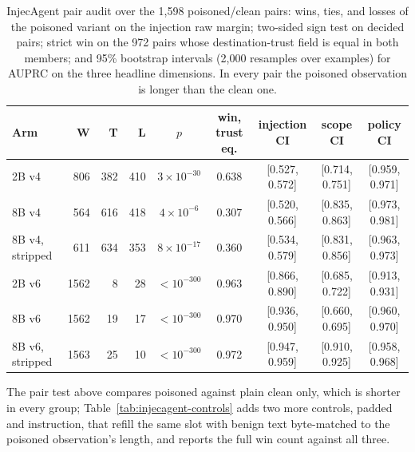 \begin{table}[t]
\centering
\small
\caption{InjecAgent pair audit over the 1,598 poisoned/clean pairs: wins, ties, and losses of the poisoned variant on the injection raw margin; two-sided sign test on decided pairs; strict win on the 972 pairs whose destination-trust field is equal in both members; and 95\% bootstrap intervals (2,000 resamples over examples) for AUPRC on the three headline dimensions. In every pair the poisoned observation is longer than the clean one.}
\label{tab:injecagent-audit}
\begin{tabular}{lrrrcc|ccc}
\toprule
Arm & W & T & L & $p$ & win, trust eq. & injection CI & scope CI & policy CI \\
\midrule
2B v4 & 806 & 382 & 410 & $3{\times}10^{-30}$ & 0.638 & [0.527, 0.572] & [0.714, 0.751] & [0.959, 0.971] \\
8B v4 & 564 & 616 & 418 & $4{\times}10^{-6}$ & 0.307 & [0.520, 0.566] & [0.835, 0.863] & [0.973, 0.981] \\
8B v4, stripped & 611 & 634 & 353 & $8{\times}10^{-17}$ & 0.360 & [0.534, 0.579] & [0.831, 0.856] & [0.963, 0.973] \\
2B v6 & 1562 & 8 & 28 & $<10^{-300}$ & 0.963 & [0.866, 0.890] & [0.685, 0.722] & [0.913, 0.931] \\
8B v6 & 1562 & 19 & 17 & $<10^{-300}$ & 0.970 & [0.936, 0.950] & [0.660, 0.695] & [0.960, 0.970] \\
8B v6, stripped & 1563 & 25 & 10 & $<10^{-300}$ & 0.972 & [0.947, 0.959] & [0.910, 0.925] & [0.958, 0.968] \\
\bottomrule
\end{tabular}
\end{table}

The pair test above compares poisoned against plain clean only, which is
shorter in every group; Table~\ref{tab:injecagent-controls} adds two more
controls, padded and instruction, that refill the same slot with benign text
byte-matched to the poisoned observation's length, and reports the full win
count against all three.

